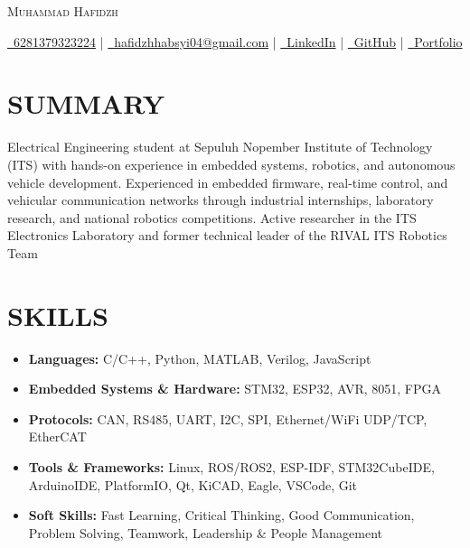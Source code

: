 \documentclass[letterpaper,11pt]{article}
\begin{document}
\begin{center}
    {\Huge \scshape \color{ACCENT_COLOR} Muhammad Hafidzh} \\ \vspace{4pt}

    \small
    \href{tel:+6281379323224}{\raisebox{-0.1\height}\faPhone\ 6281379323224} |
    \href{mailto:hafidzhhabsyi04@gmail.com}{\raisebox{-0.1\height}\faEnvelope\ hafidzhhabsyi04@gmail.com} |
    \href{https://linkedin.com/in/muhammadhafidzh}{\raisebox{-0.1\height}\faLinkedin\ LinkedIn} |
    \href{https://github.com/MuHafidzh}{\raisebox{-0.1\height}\faGithub\ GitHub} |
    \href{https://muhafidzh.github.io/}{\raisebox{-0.1\height}\faGlobe\ Portfolio}
    \vspace{-6pt}
\end{center}

\section{SUMMARY}
Electrical Engineering student at Sepuluh Nopember Institute of Technology (ITS) with hands-on experience in embedded systems, robotics, and autonomous vehicle development. Experienced in embedded firmware, real-time control, and vehicular communication networks through industrial internships, laboratory research, and national robotics competitions. Active researcher in the ITS Electronics Laboratory and former technical leader of the RIVAL ITS Robotics Team
\vspace{-2pt}

\section{SKILLS}
\begin{itemize}[noitemsep, left=0pt]
    \item \textbf{Languages:} C/C++, Python, MATLAB, Verilog, JavaScript
    \item \textbf{Embedded Systems \& Hardware:} STM32, ESP32, AVR, 8051, FPGA
    \item \textbf{Protocols:} CAN, RS485, UART, I2C, SPI, Ethernet/WiFi UDP/TCP, EtherCAT
    \item \textbf{Tools \& Frameworks:} Linux, ROS/ROS2, ESP-IDF, STM32CubeIDE, ArduinoIDE, PlatformIO, Qt, KiCAD, Eagle, VSCode, Git
    \item \textbf{Soft Skills:} Fast Learning, Critical Thinking, Good Communication, Problem Solving, Teamwork, Leadership \& People Management
\end{itemize}
\vspace{-13pt}
\end{document}
